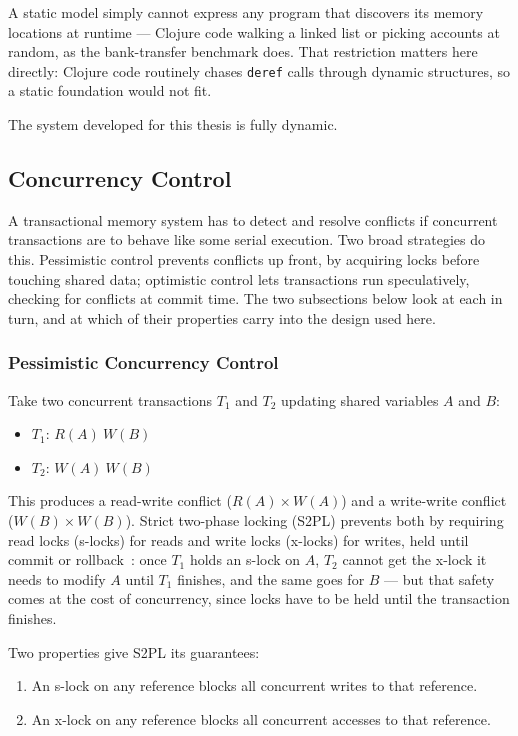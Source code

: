 A static model simply cannot express any program that discovers its memory
locations at runtime — Clojure code walking a linked list or picking accounts
at random, as the bank-transfer benchmark does.
That restriction matters here directly: Clojure code routinely chases
\texttt{deref} calls through dynamic structures, so a static foundation
would not fit.

The system developed for this thesis is fully dynamic.

\subsection{Concurrency Control}

A transactional memory system has to detect and resolve conflicts if
concurrent transactions are to behave like some serial execution. Two broad
strategies do this. Pessimistic control prevents conflicts up front, by
acquiring locks before touching shared data; optimistic control lets
transactions run speculatively, checking for conflicts at commit time.
The two subsections below look at each in turn, and at which of their
properties carry into the design used here.

\subsubsection{Pessimistic Concurrency Control}

Take two concurrent transactions $T_1$ and $T_2$ updating shared variables
$A$ and $B$:

\begin{itemize}
  \item $T_1$: $R(A)\ W(B)$
  \item $T_2$: $W(A)\ W(B)$
\end{itemize}

This produces a read-write conflict ($R(A) \times W(A)$) and a write-write
conflict ($W(B) \times W(B)$). Strict two-phase locking (S2PL) prevents both
by requiring read locks (s-locks) for reads and write locks (x-locks)
for writes, held until commit or rollback~\cite{bernstein1987}: once $T_1$
holds an s-lock on $A$, $T_2$ cannot get the x-lock it needs to modify $A$
until $T_1$ finishes, and the same goes for $B$ — but that safety comes at
the cost of concurrency, since locks have to be held until the transaction
finishes.

Two properties give S2PL its guarantees:

\begin{enumerate}
  \item An s-lock on any reference blocks all concurrent writes to that reference.
  \item An x-lock on any reference blocks all concurrent accesses to that reference.
\end{enumerate}

